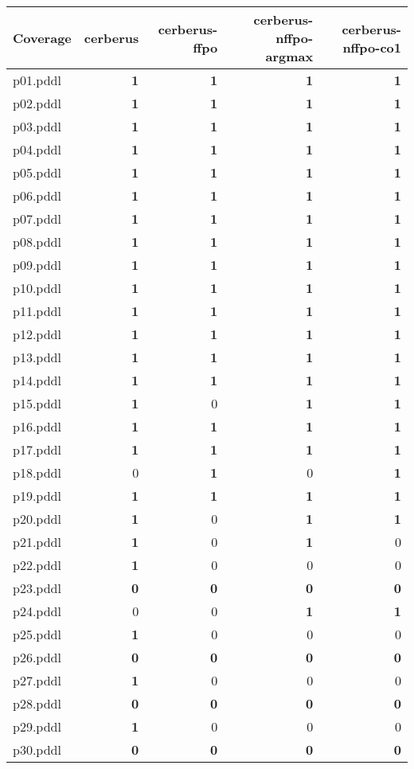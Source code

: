\documentclass{article}
\begin{document}
\begin{tabular}{@{}lrrrr@{}}
Coverage & cerberus & cerberus-ffpo & cerberus-nffpo-argmax & cerberus-nffpo-co1 \\
\midrule
p01.pddl & \textbf{1} & \textbf{1} & \textbf{1} & \textbf{1} \\
p02.pddl & \textbf{1} & \textbf{1} & \textbf{1} & \textbf{1} \\
p03.pddl & \textbf{1} & \textbf{1} & \textbf{1} & \textbf{1} \\
p04.pddl & \textbf{1} & \textbf{1} & \textbf{1} & \textbf{1} \\
p05.pddl & \textbf{1} & \textbf{1} & \textbf{1} & \textbf{1} \\
p06.pddl & \textbf{1} & \textbf{1} & \textbf{1} & \textbf{1} \\
p07.pddl & \textbf{1} & \textbf{1} & \textbf{1} & \textbf{1} \\
p08.pddl & \textbf{1} & \textbf{1} & \textbf{1} & \textbf{1} \\
p09.pddl & \textbf{1} & \textbf{1} & \textbf{1} & \textbf{1} \\
p10.pddl & \textbf{1} & \textbf{1} & \textbf{1} & \textbf{1} \\
p11.pddl & \textbf{1} & \textbf{1} & \textbf{1} & \textbf{1} \\
p12.pddl & \textbf{1} & \textbf{1} & \textbf{1} & \textbf{1} \\
p13.pddl & \textbf{1} & \textbf{1} & \textbf{1} & \textbf{1} \\
p14.pddl & \textbf{1} & \textbf{1} & \textbf{1} & \textbf{1} \\
p15.pddl & \textbf{1} & 0 & \textbf{1} & \textbf{1} \\
p16.pddl & \textbf{1} & \textbf{1} & \textbf{1} & \textbf{1} \\
p17.pddl & \textbf{1} & \textbf{1} & \textbf{1} & \textbf{1} \\
p18.pddl & 0 & \textbf{1} & 0 & \textbf{1} \\
p19.pddl & \textbf{1} & \textbf{1} & \textbf{1} & \textbf{1} \\
p20.pddl & \textbf{1} & 0 & \textbf{1} & \textbf{1} \\
p21.pddl & \textbf{1} & 0 & \textbf{1} & 0 \\
p22.pddl & \textbf{1} & 0 & 0 & 0 \\
p23.pddl & \textbf{0} & \textbf{0} & \textbf{0} & \textbf{0} \\
p24.pddl & 0 & 0 & \textbf{1} & \textbf{1} \\
p25.pddl & \textbf{1} & 0 & 0 & 0 \\
p26.pddl & \textbf{0} & \textbf{0} & \textbf{0} & \textbf{0} \\
p27.pddl & \textbf{1} & 0 & 0 & 0 \\
p28.pddl & \textbf{0} & \textbf{0} & \textbf{0} & \textbf{0} \\
p29.pddl & \textbf{1} & 0 & 0 & 0 \\
p30.pddl & \textbf{0} & \textbf{0} & \textbf{0} & \textbf{0} \\
\end{tabular}
\end{document}
